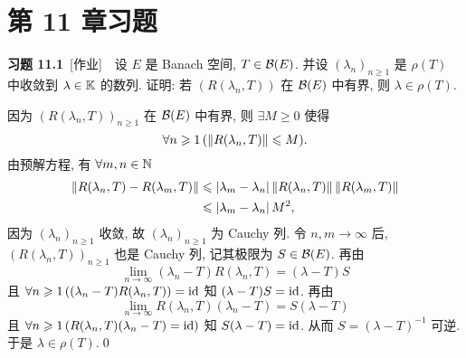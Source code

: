\section{第 11 章习题}
	\textbf{习题 11.1}\ [作业]\ \ 设 $ E $ 是 Banach 空间, $ T\in\mathcal{B}(E) $. 并设 $ (\lambda_{n})_{n\geqslant1} $ 是 $ \rho(T) $ 中收敛到 $ \lambda\in\mathbb{K} $ 的数列. 证明: 若 $ (R(\lambda_{n}, T)) $ 在 $ \mathcal{B}(E) $ 中有界, 则 $ \lambda\in\rho(T) $.
	\begin{Proof}
		因为 $ (R(\lambda_{n}, T))_{n\geqslant1} $ 在 $ \mathcal{B}(E) $ 中有界, 则 $ \exists M\geqslant0 $ 使得
		\[
			\forall n\geqslant1\,(\left\| R(\lambda_{n}, T) \right\|\leqslant M).
		\]
		由预解方程, 有 $ \forall m, n\in\mathbb{N} $
		\[
			\begin{aligned}
				\left\| R(\lambda_{n}, T)-R(\lambda_{m}, T) \right\| & \leqslant \left| \lambda_{m}-\lambda_{n} \right| \left\| R(\lambda_{n}, T) \right\|\left\| R(\lambda_{m}, T) \right\|\\
				& \leqslant\left| \lambda_{m}-\lambda_{n} \right| M^{2},
			\end{aligned}
		\]
		因为 $ (\lambda_{n})_{n\geqslant1} $ 收敛, 故 $ (\lambda_{n})_{n\geqslant1} $ 为 Cauchy 列. 令 $ n, m\to\infty $ 后, $ (R(\lambda_{n}, T))_{n\geqslant1} $ 也是 Cauchy 列, 记其极限为 $ S\in\mathcal{B}(E) $. 再由
		\[
			\lim_{n\to\infty}(\lambda_{n}-T)R(\lambda_{n}, T)=(\lambda-T)S
		\]
		且 $ \forall n\geqslant1\,((\lambda_{n}-T)R(\lambda_{n}, T))=\mathrm{id} $ 知 $ (\lambda-T)S=\mathrm{id} $. 再由
		\[
			\lim_{n\to\infty} R(\lambda_{n}, T)(\lambda_{n}-T)=S(\lambda-T)
		\]
		且 $ \forall n\geqslant1\,(R(\lambda_{n}, T)(\lambda_{n}-T)=\mathrm{id}) $ 知 $ S(\lambda-T)=\mathrm{id} $. 从而 $ S=(\lambda-T)^{-1} $ 可逆. 于是 $ \lambda\in\rho(T) $.\qed
	\end{Proof}

